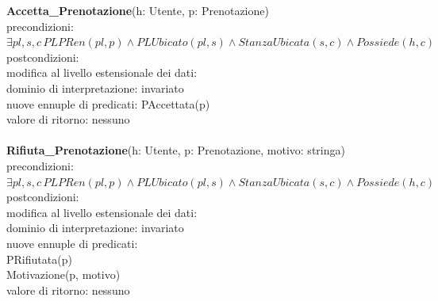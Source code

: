 \documentclass[a4paper,12pt]{report}
\begin{document}
        \hspace*{-1cm}
        \textbf{Accetta\_Prenotazione}(h: Utente, p: Prenotazione) \\
        \hspace*{1cm} precondizioni: $\exists pl, s, c \, PLPRen(pl, p) \wedge PLUbicato(pl, s) \wedge StanzaUbicata(s, c) \wedge Possiede(h, c)$ \\
        \hspace*{1cm} postcondizioni: \\
        \hspace*{2cm} modifica al livello estensionale dei dati: \\
        \hspace*{3cm} dominio di interpretazione: invariato \\
        \hspace*{3cm} nuove ennuple di predicati: PAccettata(p) \\
        \hspace*{2cm} valore di ritorno: nessuno \\ \\

        \hspace*{-1cm}
        \textbf{Rifiuta\_Prenotazione}(h: Utente, p: Prenotazione, motivo: stringa) \\
        \hspace*{1cm} precondizioni: $\exists pl, s, c \, PLPRen(pl, p) \wedge PLUbicato(pl, s) \wedge StanzaUbicata(s, c) \wedge Possiede(h, c)$ \\
        \hspace*{1cm} postcondizioni: \\
        \hspace*{2cm} modifica al livello estensionale dei dati: \\
        \hspace*{3cm} dominio di interpretazione: invariato \\
        \hspace*{3cm} nuove ennuple di predicati: \\
        \hspace*{4cm} PRifiutata(p) \\
        \hspace*{4cm} Motivazione(p, motivo) \\
        \hspace*{2cm} valore di ritorno: nessuno \\ \\
\end{document}

